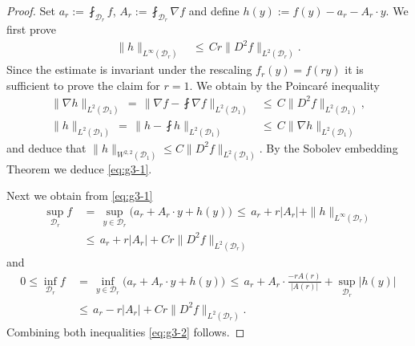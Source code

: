 \documentclass[reqno,makeidx,12pt]{amsart}
\theoremstyle{note}
\theoremstyle{definition}
\begin{document}
\begin{proof}
Set $a_r:=\fint_{{\mathcal{D}}_r}f$, $A_r:=\fint_{{\mathcal{D}}_r}\nabla f$ and define $h(y):=f(y)-a_r -A_r \cdot y$. We first prove
\begin{align}
	\|h\|_{L^\infty({\mathcal{D}}_r)} \,&\leq\, Cr\|D^2f\|_{L^2({\mathcal{D}}_r)}. \label{eq:g3-1}
\end{align}
Since the estimate is invariant under the rescaling $f_r(y)=f(ry)$ it is sufficient to prove the claim for $r=1$. We obtain by the Poincar{\'e} inequality
\begin{align*}
	\|\nabla h\|_{L^2({\mathcal{D}}_1)}\,=\, \|\nabla f - \fint\nabla f \|_{L^2({\mathcal{D}}_1)} &\leq\,  C\|D^2f\|_{L^2({\mathcal{D}}_1)},\\
	\|h\|_{L^2({\mathcal{D}}_1)}\,=\, \| h - \fint h \|_{L^2({\mathcal{D}}_1)} &\leq\,  C\|\nabla h\|_{L^2({\mathcal{D}}_1)}
\end{align*}
and deduce that $\|h\|_{W^{2,2}({\mathcal{D}}_1)}\leq C\|D^2f\|_{L^2({\mathcal{D}}_1)}$. By the Sobolev embedding Theorem we deduce \eqref{eq:g3-1}. 

Next we obtain from \eqref{eq:g3-1}
\begin{align*}
	\sup_{{\mathcal{D}}_r} f \,&=\, \sup_{y\in {\mathcal{D}}_r} \Big(a_r + A_r\cdot y + h(y)\Big)\,\leq\, a_r+r|A_r|+ \|h\|_{L^\infty({\mathcal{D}}_r)}\\
	&\leq\, a_r+r|A_r|+Cr\|D^2f\|_{L^2({\mathcal{D}}_r)}
\end{align*}
and
\begin{align*}
	0\leq \inf_{{\mathcal{D}}_r} f \,&=\, \inf_{y\in {\mathcal{D}}_r} \Big(a_r + A_r\cdot y + h(y)\Big)\,\leq\, a_r + A_r\cdot \frac{-rA(r)}{|A(r)|} + \sup_{{\mathcal{D}}_r} |h(y)|\\
	& \leq\, a_r -r|A_r| + Cr\|D^2f\|_{L^2({\mathcal{D}}_r)}.
\end{align*}
Combining both  inequalities \eqref{eq:g3-2} follows.
\end{proof}
\end{document}
